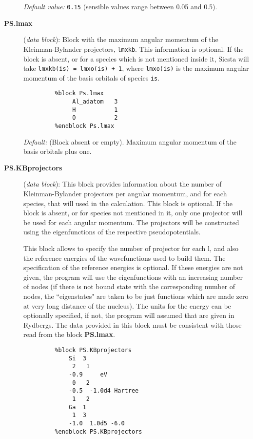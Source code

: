 \documentclass[11pt]{article}
\begin{document}
\begin{description}
{\it Default value:} {\tt 0.15} (sensible values range between 0.05 and 0.5).


\item[{\bf PS.lmax}]  ({\it data block}): 
Block with the maximum angular momentum of the Kleinman-Bylander 
projectors, {\tt lmxkb}. 
This information is optional. If the block 
is absent, or for a species which is not mentioned inside 
it, {\sc Siesta} will take {\tt lmxkb(is) = lmxo(is) + 1}, where {\tt lmxo(is)}
is the maximum angular momentum of the basis orbitals of species {\tt is}.
\begin{verbatim}
         %block Ps.lmax
              Al_adatom   3
              H           1
              O           2
         %endblock Ps.lmax
\end{verbatim}
{\it Default:} (Block absent or empty). Maximum angular momentum 
of the basis orbitals plus one.
\noindent

\item[{\bf PS.KBprojectors}] ({\it data block}):
This block provides information about the number of Kleinman-Bylander
projectors per angular momentum, and for each species, that will used
in the calculation. This block is optional.
If the block is absent, or for species not mentioned in it, only 
one projector will be used for each angular momentum. The projectors
will be constructed using the eigenfunctions of the respective
pseudopotentials. 


This block allows to specify the number of projector for each l, and also
the reference energies of the wavefunctions used to build them.
The specification of the reference energies is optional. If these 
energies are not given, the program will use the eigenfunctions with an
increasing number of nodes (if there is not bound state with
the corresponding number of nodes, the ``eigenstates" are taken to be just
functions which are made zero at very long distance of the nucleus).
The units for the energy can be optionally specified, if not, the 
program will assumed that are given in Rydbergs. 
The data provided in this block must be consistent with those 
read from the block {\bf PS.lmax}. 

\begin{verbatim}
         %block PS.KBprojectors
             Si  3
              2   1 
             -0.9     eV
              0   2
             -0.5  -1.0d4 Hartree
              1   2
             Ga  1
              1  3
             -1.0  1.0d5 -6.0
         %endblock PS.KBprojectors
\end{verbatim}


\end{description}
\end{document}
